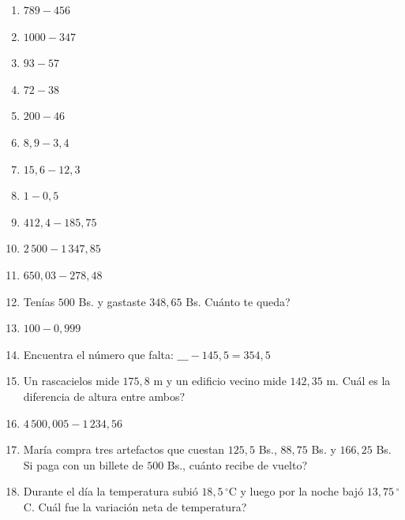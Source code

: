 \documentclass[12pt, letterpaper]{article}
\begin{document}
\begin{enumerate}[leftmargin=*, start=23]
  \item \facil{} $789 - 456$

  \item \facil{} $1000 - 347$

  \item \facil{} $93 - 57$

  \item \facil{} $72 - 38$ %

  \item \facil{} $200 - 46$ %

  \item \facil{} $8{,}9 - 3{,}4$

  \item \facil{} $15{,}6 - 12{,}3$

  \item \facil{} $1 - 0{,}5$

  \item \medio{} $412{,}4 - 185{,}75$

  \item \medio{} $2\,500 - 1\,347{,}85$

  \item \medio{} $650{,}03 - 278{,}48$

  \item \medio{} Tenías $500$ Bs. y gastaste $348{,}65$ Bs. \textquestiondown Cuánto te queda?

  \item \medio{} $100 - 0{,}999$

  \item \medio{} Encuentra el número que falta: $\_\_\_ - 145{,}5 = 354{,}5$

  \item \medio{} Un rascacielos mide $175{,}8$ m y un edificio vecino mide $142{,}35$ m. \textquestiondown Cuál es la diferencia de altura entre ambos?

  \item \medio{} $4\,500{,}005 - 1\,234{,}56$

  \item \dificil{} María compra tres artefactos que cuestan $125{,}5$ Bs., $88{,}75$ Bs. y $166{,}25$ Bs. Si paga con un billete de $500$ Bs., \textquestiondown cuánto recibe de vuelto?

  \item \dificil{} Durante el día la temperatura subió $18{,}5\,^{\circ}$C y luego por la noche bajó $13{,}75\,^{\circ}$C. \textquestiondown Cuál fue la variación neta de temperatura?


\end{enumerate}
\end{document}
